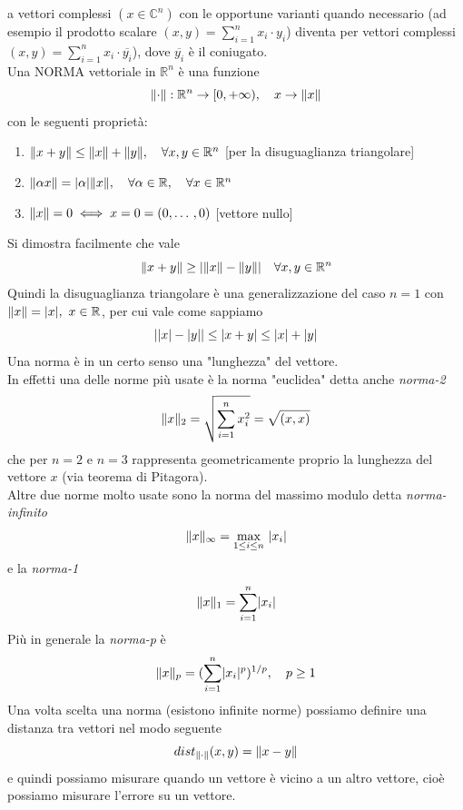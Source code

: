\documentclass[12pt,a4paper]{article}
\DeclarePairedDelimiter{\abs}{\lvert}{\rvert}
\DeclarePairedDelimiter{\norma}{\lVert}{\rVert}
\begin{document}
a vettori complessi $(x \in \mathbb{C}^n)$ con le opportune varianti quando necessario (ad esempio il prodotto scalare $(x,y) = \sum\limits_{i=1}^n x_i \cdot y_i$) diventa per vettori complessi $(x,y) = \sum\limits_{i=1}^n x_i \cdot \overline{y_i}$), dove $\overline{y_i}$ è il coniugato.\\
Una NORMA vettoriale in $\mathbb{R}^n$ è una funzione
\[
\norma{\cdot} : \mathbb{R}^n \to [ 0, + \infty ), \quad x \to \norma{x}
\]
con le seguenti proprietà:
\begin{enumerate}
    \item $\norma{x+y} \le \norma{x} + \norma{y}, \quad \forall x,y \in \mathbb{R}^n$ [per la disuguaglianza triangolare]
    
    \item $\norma{\alpha x} = \abs{\alpha} \norma{x}, \quad \forall \alpha \in \mathbb{R}, \quad \forall x \in \mathbb{R}^n$
    
    \item $\norma{x} = 0 \iff x = 0 = (0, \dotso , 0)$ [vettore nullo]
\end{enumerate}
Si dimostra facilmente che vale
\[
\norma{x+y} \ge \abs{\norma{x} - \norma{y}} \quad \forall x, y \in \mathbb{R}^n
\]
Quindi la disuguaglianza triangolare è una generalizzazione del caso $n=1$ con $\norma{x} = \abs{x}, \ x \in \mathbb{R}$, per cui vale come sappiamo
\[
\abs{\abs{x} - \abs{y}} \le \abs{x+y} \le \abs{x} + \abs{y}
\]
Una norma è in un certo senso una "lunghezza" del vettore.\\
In effetti una delle norme più usate è la norma "euclidea" detta anche \textit{norma-2}
\[
\norma{x}_2 = \sqrt{\sum_{i=1}^n x_i^2} = \sqrt{(x,x)}
\]
che per $n=2$ e $n=3$ rappresenta geometricamente proprio la lunghezza del vettore $x$ (via teorema di Pitagora).\\
Altre due norme molto usate sono la norma del massimo modulo detta \textit{norma-infinito}
\[
\norma{x}_\infty = \underset{1 \le i \le n}{\text{max}} \ \abs{x_i}
\]
e la \textit{norma-1}
\[
\norma{x}_1 = \sum_{i=1}^n \abs{x_i}
\]
Più in generale la \textit{norma-p} è
\[
\norma{x}_p = (\sum_{i=1}^n \abs{x_i}^p)^{1/p}, \quad p \ge 1
\]
Una volta scelta una norma (esistono infinite norme) possiamo definire una distanza tra vettori nel modo seguente
\[
dist_{\norma{\cdot}} (x,y) = \norma{x-y}
\]
e quindi possiamo misurare quando un vettore è vicino a un altro vettore, cioè possiamo misurare l'errore su un vettore.\\
\end{document}
